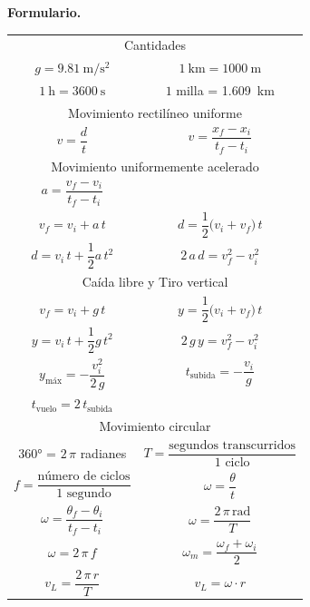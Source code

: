 \documentclass[12pt, letter]{exam}
\begin{document}
    \newpage

\textbf{\huge{Formulario.}}
\begin{table}[H]
    \centering
    \setlength{\tabcolsep}{40pt}
    \renewcommand{\arraystretch}{2}
    \begin{tabular}{c  c}
        \multicolumn{2}{c}{Cantidades} \\
            $g = \SI{9.81}{\meter\per\square\second}$ & $\SI{1}{\kilo\meter} = \SI{1000}{\meter}$  \\
            $\SI{1}{\hour} = \SI{3600}{\second}$ & $1$ milla = \SI{1.609}{\kilo\meter} \\ \hline
        \multicolumn{2}{c}{Movimiento rectilíneo uniforme} \\
            $v = \dfrac{d}{t}$ & $v = \dfrac{x_{f} - x_{i}}{t_{f} - t_{i}}$ \\ \hline
		\multicolumn{2}{c}{Movimiento uniformemente acelerado} \\
            $a = \dfrac{v_{f} - v_{i}}{t_{f} - t_{i}}$ & \\
            $v_{f} = v_{i} + a \, t$ & $d = \dfrac{1}{2} \big( v_{i} + v_{f} \big) \, t$ \\
            $d = v_{i} \, t + \dfrac{1}{2} a \, t^{2}$ & $2 \, a \, d = v_{f}^{2} - v_{i}^{2}$ \\ \hline
        \multicolumn{2}{c}{Caída libre y Tiro vertical} \\
            $v_{f} = v_{i} + g \, t$ & $y = \dfrac{1}{2} \big( v_{i} + v_{f} \big) \, t$ \\
            $y = v_{i} \, t + \dfrac{1}{2} g \, t^{2}$ & $2 \, g \, y = v_{f}^{2} - v_{i}^{2}$ \\ 
            $y_{\text{máx}} = - \dfrac{v_{i}^{2}}{2 \, g}$ & $t_{\text{subida}} = - \dfrac{v_{i}}{g}$ \\
            $t_{\text{vuelo}} = 2 \, t_{\text{subida}}$ & \\ \hline
        \multicolumn{2}{c}{Movimiento circular} \\
        \ang{360} = $2 \, \pi$ radianes & $T = \dfrac{\text{segundos transcurridos}}{\text{1 ciclo}}$ \\
        $f = \dfrac{\text{número de ciclos}}{\text{1 segundo}}$ & $\omega = \dfrac{\theta}{t}$ \\
        $\omega = \dfrac{\theta_{f} - \theta_{i}}{t_{f} - t_{i}}$ & $\omega = \dfrac{2 \, \pi \, \text{rad}}{T}$ \\
        $\omega = 2 \, \pi \, f $ & $\omega_{m} = \dfrac{\omega_{f} + \omega_{i}}{2}$ \\
        $v_{L} = \dfrac{2 \, \pi \, r}{T}$ & $v_{L} = \omega \cdot r$ \\
    \end{tabular}
\end{table}
\end{document}
